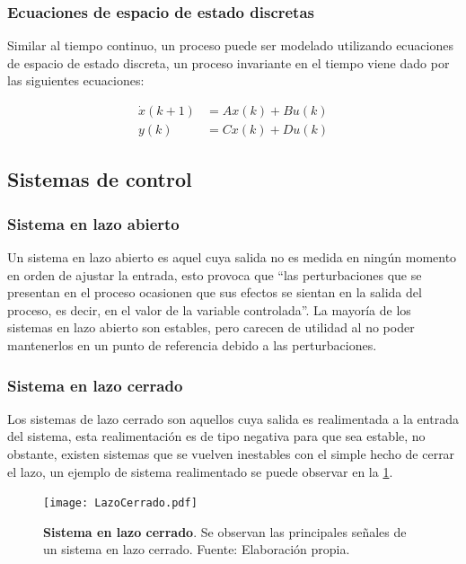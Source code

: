 		\subsubsection{Ecuaciones de espacio de estado discretas}
			
			Similar al tiempo continuo, un proceso puede ser modelado utilizando ecuaciones de espacio de estado discreta, un proceso invariante en el tiempo viene dado por las siguientes ecuaciones:
			
			\begin{align}\label{eq:SSdiscreto}
				\dot{x}(k+1) &= Ax(k) + Bu(k) \\
				y(k) &= Cx(k) + Du(k)
			\end{align}
		
	\subsection{Sistemas de control}
		
		\subsubsection{Sistema en lazo abierto}
		
			Un sistema en lazo abierto es aquel cuya salida no es medida en ningún momento en orden de ajustar la entrada, esto provoca que \enquote{las perturbaciones que se presentan en el proceso ocasionen que sus efectos se sientan en la salida del proceso, es decir, en el valor de la variable controlada}\Parencite[p.$\,$350]{maloney2006electronica}. La mayoría de los sistemas en lazo abierto son estables, pero carecen de utilidad al no poder mantenerlos en un punto de referencia debido a las perturbaciones.
		
		\subsubsection{Sistema en lazo cerrado}
		
			Los sistemas de lazo cerrado son aquellos cuya salida es realimentada a la entrada del sistema, esta realimentación es de tipo negativa para que sea estable, no obstante, existen sistemas que se vuelven inestables con el simple hecho de cerrar el lazo, un ejemplo de sistema realimentado se puede observar en la \cref{fig:LazoCerrado}.
			
			\begin{figure}[htb]
				\centering
				\texttt{[image: LazoCerrado.pdf]}
				\caption[Ejemplo de un sistema en lazo cerrado]{\textbf{Sistema en lazo cerrado}. Se observan las principales señales de un sistema en lazo cerrado. Fuente: Elaboración propia.} 
				\label{fig:LazoCerrado}
			\end{figure}
			

